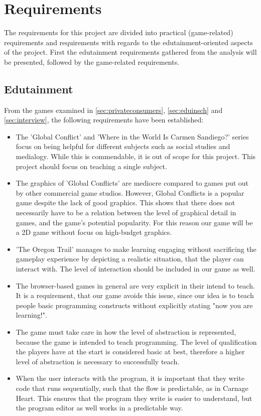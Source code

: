 \section{Requirements}
\label{sec:requirements}

The requirements for this project are divided into practical (game-related) requirements and requirements with regards to the edutainment-oriented aspects of the project.
First the edutainment requirements gathered from the analysis will be presented, followed by the game-related requirements.

\subsection{Edutainment}

From the games examined in \autoref{sec:privateconsumers}, \autoref{sec:eduinsch} and \autoref{sec:interview}, the following requirements have been established: 

\begin{itemize}
	\item The 'Global Conflict' and 'Where in the World Is Carmen Sandiego?' series focus on being helpful for different subjects such as social studies and medialogy.
While this is commendable, it is out of scope for this project.
This project should focus on teaching a single subject.
	\item The graphics of 'Global Conflicts' are mediocre compared to games put out by other commercial game studios.
	However, Global Conflicts is a popular game despite the lack of good graphics.
	This shows that there does not necessarily have to be a relation between the level of graphical detail in games, and the game's potential popularity.
	For this reason our game will be a 2D game without focus on high-budget graphics.
	\item 'The Oregon Trail' manages to make learning engaging without sacrificing the gameplay experience by depicting a realistic situation, that the player can interact with.
	The level of interaction should be included in our game as well.
	\item The browser-based games in general are very explicit in their intend to teach.
	It is a requirement, that our game avoids this issue, since our idea is to teach people basic programming constructs without explicitly stating "now you are learning!".
	\item The game must take care in how the level of abstraction is represented, because the game is intended to teach programming.
	The level of qualification the players have at the start is considered basic at best, therefore a higher level of abstraction is necessary to successfully teach.
	\item When the user interacts with the program, it is important that they write code that runs sequentially, such that the flow is predictable, as in Carnage Heart.
	This ensures that the program they write is easier to understand, but the program editor as well works in a predictable way.
\end{itemize}

